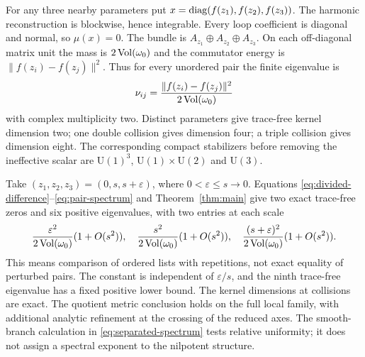 For any three nearby parameters put
$x=\operatorname{diag}(f(z_1),f(z_2),f(z_3))$.
The harmonic reconstruction is blockwise, hence integrable.
Every loop coefficient is diagonal and normal, so $\mu(x)=0$.
The bundle is $A_{z_1}\oplus A_{z_2}\oplus A_{z_3}$.
On each off-diagonal matrix unit the mass is $2\operatorname{Vol}(\omega_0)$
and the commutator energy is $\|f(z_i)-f(z_j)\|^2$.
Thus for every unordered pair the finite eigenvalue is
\begin{equation}\label{eq:pair-spectrum}
 \nu_{ij}=\frac{\|f(z_i)-f(z_j)\|^2}{2\operatorname{Vol}(\omega_0)}
\end{equation}
with complex multiplicity two. Distinct parameters give trace-free
kernel dimension two; one double collision gives dimension four;
a triple collision gives dimension eight.
The corresponding compact stabilizers before removing the
ineffective scalar are $\mathrm U(1)^3$,
$\mathrm U(1)\times\mathrm U(2)$ and $\mathrm U(3)$.

Take $(z_1,z_2,z_3)=(0,s,s+\varepsilon)$, where
$0<\varepsilon\le s\to0$. Equations
\eqref{eq:divided-difference}--\eqref{eq:pair-spectrum} and
Theorem~\ref{thm:main} give two exact trace-free zeros and six
positive eigenvalues, with two entries at each scale
\begin{equation}\label{eq:separated-spectrum}
 \frac{\varepsilon^2}{2\operatorname{Vol}(\omega_0)}(1+O(s^2)),\quad
 \frac{s^2}{2\operatorname{Vol}(\omega_0)}(1+O(s^2)),\quad
 \frac{(s+\varepsilon)^2}{2\operatorname{Vol}(\omega_0)}(1+O(s^2)).
\end{equation}
This means comparison of ordered lists with repetitions, not
exact equality of perturbed pairs. The constant is independent
of $\varepsilon/s$, and the ninth trace-free eigenvalue has a
fixed positive lower bound. The kernel dimensions at collisions
are exact. The quotient metric conclusion holds on the full local
family, with additional analytic refinement at the crossing of
the reduced axes. The smooth-branch calculation in
\eqref{eq:separated-spectrum} tests relative uniformity; it does
not assign a spectral exponent to the nilpotent structure.

